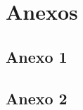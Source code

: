 \section{Anexos}
\lipsum[1]
\subsection{Anexo 1}
\lipsum[1]
\subsection{Anexo 2}
\lipsum[1]
\clearpage




